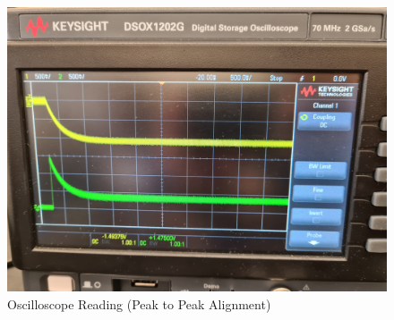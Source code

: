 \documentclass[a4paper,12pt]{article}
\begin{document}
\begin{figure}[H]
  \centering
  \includegraphics[width=1.0\linewidth]{../data/20211116_101233.jpg}    
  \begin{center}
    \begin{center}   
    \end{center}  \end{center}
  \caption{Oscilloscope Reading (Peak to Peak Alignment)}
  \label{osc}
\end{figure}
\end{document}
